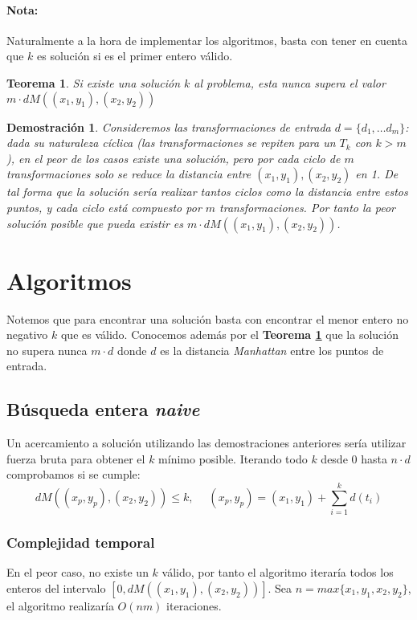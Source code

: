 \documentclass{article}
\theoremstyle{default}
\newtheorem{theorem}{Teorema}
\newtheorem*{demonstration}{Demostración}
\begin{document}
	\paragraph{Nota:}Naturalmente a la hora de implementar los algoritmos, basta con tener en cuenta que $k$ es solución si es el primer entero válido.
%
	\begin{theorem}\label{thm:valid-k-max}
		Si existe una solución $k$ al problema, esta nunca supera el valor $m \cdot dM((x_1,y_1),(x_2,y_2))$
	\end{theorem}
	\begin{demonstration}
		Consideremos las transformaciones de entrada $d = \{d_1, \dots d_m\}$: dada su naturaleza cíclica (las transformaciones se repiten para un $T_k$ con $k > m$), en el peor de los casos existe una solución, pero por cada ciclo de $m$ transformaciones solo se reduce la distancia entre $(x_1,y_1), (x_2,y_2)$ en 1. De tal forma que la solución sería realizar tantos ciclos como la distancia entre estos puntos, y cada ciclo está compuesto por $m$ transformaciones. Por tanto la peor solución posible que pueda existir es $m \cdot dM((x_1,y_1),(x_2,y_2))$.
	\end{demonstration}
%
%
\section{Algoritmos}
	Notemos que para encontrar una solución basta con encontrar el menor entero no negativo $k$ que es válido. Conocemos además por el \textbf{Teorema \ref{thm:valid-k-max}} que la solución no supera nunca $m \cdot d$ donde $d$ es la distancia \textit{Manhattan} entre los puntos de entrada.
%
\subsection{Búsqueda entera \textit{naive}}
	Un acercamiento a solución utilizando las demostraciones anteriores sería utilizar fuerza bruta para obtener el $k$ mínimo posible. Iterando todo $k$ desde $0$ hasta $n \cdot d$ comprobamos si se cumple:
	\begin{equation*}
		dM((x_p,y_p), (x_2,y_2)) \leq k, \quad\; (x_p,y_p) = (x_1,y_1) + \sum\limits_{i=1}^{k}{d(t_i)}
	\end{equation*}

	\subsubsection{Complejidad temporal}
		En el peor caso, no existe un $k$ válido, por tanto el algoritmo iteraría todos los enteros del intervalo $[0,dM((x_1,y_1),(x_2,y_2))]$. Sea $n = max\{x_1, y_1, x_2, y_2\}$, el algoritmo realizaría $O(nm)$ iteraciones.
\end{document}
